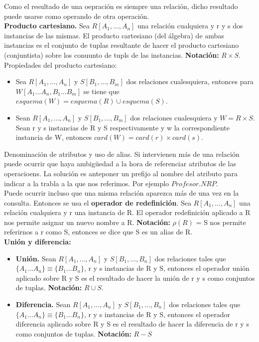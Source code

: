 \documentclass[a4paper,11pt]{article}
\begin{document}
Como el resultado de una oepración es siempre una relación, dicho resultado puede usarse como operando de otra operación. \\

\textbf{Producto cartesiano.} Sea $R[A_1,\ldots,A_n]$ una relación cualquiera y r y s dos instancias de las mismas. El producto cartesiano (del álgebra) de ambas instancias es el conjunto de tuplas resultante de hacer el producto cartesiano (conjuntista) sobre los conuunto de tupls de las instancias. \textbf{Notación:} $R\times S$. \\

Propiedades del producto cartesiano:

\begin{itemize}
\item Sea $R[A_1,\ldots,A_n]$ y $S[B_1,\ldots,B_m]$ dos relaciones cualesquiera, entonces para $W[A_1\ldots A_n,B_1\ldots B_m]$ se tiene que $esquema(W)=esquema(R)\cup esquema(S).$

\item Sean $R[A_1,\ldots,A_n]$ y $S[B_1,\ldots,B_m]$ dos relaciones cualesquiera y $W=R \times S$. Sean r y s instancias de R y S respectivamente y w la correspondiente instancia de W, entonces $card(W)=card(r)\times card(s)$.
\end{itemize}

Denominación de atributos y uso de alias. Si intervienen más de una relación puede ocurrir que haya ambigüedad a la hora de referenciar atributos de las operacioens. La solución es anteponer un prefijo al nombre del atributo para indicar a la trabla a la que nos referimos. Por ejemplo $Profesor.NRP$. \\

Puede ocurrir incluso que una misma relación aparezca más de una vez en la consulta. Entonces se usa el \textbf{operador de redefinición}. Sea $R[A_1,\ldots,A_n]$ una relación cualquiera y r una instancia de R. El operador redefinición aplicado a R nos permite asignar un nuevo nombre a R. \textbf{Notación:} $\rho(R)$ = S nos permite referirnos a r como S, entonces se dice que S es un alias de R. \\

\textbf{Unión y diferencia:}

\begin{itemize}
\item \textbf{Unión.} Sean $R[A_1,\ldots,A_n]$ y $S[B_1,\ldots,B_n]$ dos relaciones tales que $\{A_1\ldots A_n\}\equiv\{B_1\ldots B_n\}$, r y s instancias de R y S, entonces el operador unión aplicado sobre R y S es el resultado de hacer la unión de r y s como conjuntos de tuplas. \textbf{Notación:} $R \cup S$. 

\item \textbf{Diferencia.} Sean $R[A_1,\ldots,A_n]$ y $S[B_1,\ldots,B_n]$ dos relaciones tales que $\{A_1\ldots A_n\}\equiv\{B_1\ldots B_n\}$, r y s  instancias de R y S, entonces el operador diferencia aplicado sobre R y S es el resultado de hacer la diferencia de r y s como conjuntos de tuplas. \textbf{Notación:} $R-S$
\end{itemize}
\end{document}
